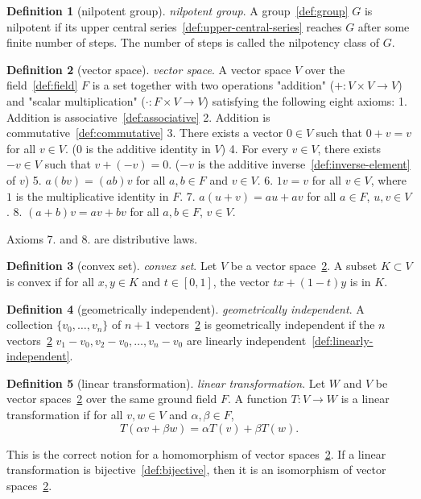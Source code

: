 \documentclass[12pt,a4paper]{article}
\theoremstyle{definition}
\newtheorem{definition}{Definition}
\begin{document}
\begin{definition}[nilpotent group]\label{def:nilpotent-group}
\emph{nilpotent group}. A group~\ref{def:group} $G$ is nilpotent if its upper central series~\ref{def:upper-central-series} reaches $G$ after some finite number of steps. The number of steps is called the nilpotency class of $G$.
\end{definition}

\begin{definition}[vector space]\label{def:vector-space}
\emph{vector space}. A vector space $V$ over the field~\ref{def:field} $F$ is a set together with two operations "addition" ($+: V\times V \to V$) and "scalar multiplication" ($\cdot: F\times V \to V$) satisfying the following eight axioms:
1. Addition is associative~\ref{def:associative}
2. Addition is commutative~\ref{def:commutative}
3. There exists a vector $0 \in V$ such that $0 + v = v$ for all $v \in V$. ($0$ is the additive identity in $V$)
4. For every $v \in V$, there exists $-v \in V$ such that $v + (-v) = 0$. ($-v$ is the additive inverse~\ref{def:inverse-element} of $v$)
5. $a(bv)= (ab)v$ for all $a,b \in F$ and $v \in V$.
6. $1v = v$ for all $v \in V$, where $1$ is the multiplicative identity in $F$.
7. $a(u+v) = au+av$ for all $a \in F$, $u,v \in V$.
8. $(a+b)v = av+bv$ for all $a,b \in F$, $v\in V$.

Axioms 7. and 8. are distributive laws.
\end{definition}

\begin{definition}[convex set]\label{def:convex-set}
\emph{convex set}. Let $V$ be a vector space~\ref{def:vector-space}. A subset $K\subset V$ is convex if for all $x,y \in K$ and $t \in [0,1]$, the vector $tx + (1-t)y$ is in $K$.
\end{definition}

\begin{definition}[geometrically independent]\label{def:geometrically-independent}
\emph{geometrically independent}. A collection $\{v_0,\dots,v_n\}$ of $n+1$ vectors~\ref{def:vector-space} is geometrically independent if the $n$ vectors~\ref{def:vector-space} $v_1-v_0, v_2-v_0, \dots, v_n-v_0$ are linearly independent~\ref{def:linearly-independent}.
\end{definition}

\begin{definition}[linear transformation]\label{def:linear-transformation}
\emph{linear transformation}. Let $W$ and $V$ be vector spaces~\ref{def:vector-space} over the same ground field $F$. A function $T: V \to W$ is a linear transformation if for all $v,w \in V$ and $\alpha,\beta \in F$, $$T(\alpha v+\beta w) = \alpha T(v) + \beta T(w).$$

This is the correct notion for a homomorphism of vector spaces~\ref{def:vector-space}. If a linear transformation is bijective~\ref{def:bijective}, then it is an isomorphism of vector spaces~\ref{def:vector-space}.
\end{definition}
\end{document}
